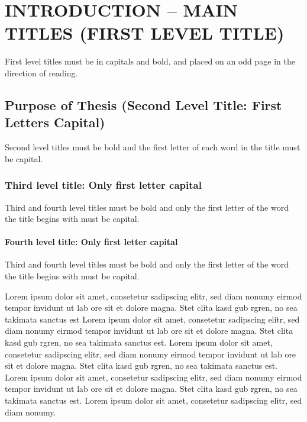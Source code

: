 \chapter{INTRODUCTION -- MAIN TITLES (FIRST LEVEL TITLE)}\label{Ch1}

First level titles must be in capitals and bold, and placed on an odd page in the direction of reading.

\section{Purpose of Thesis (Second Level Title: First Letters Capital)}\label{purposeofthesis}

Second level titles must be bold and the first letter of each word in the title must be capital.

\subsection{Third level title: Only first letter capital}

Third and fourth level titles must be bold and only the first letter of the word the title begins with must be capital.

\subsubsection{Fourth level title: Only first letter capital}

Third and fourth level titles must be bold and only the first letter of the word the title begins with must be capital.


Lorem ipsum dolor sit amet, consetetur sadipscing elitr, sed diam nonumy eirmod tempor invidunt ut lab ore sit et dolore magna. Stet clita kasd gub rgren, no sea takimata sanctus est Lorem ipsum dolor sit amet, consetetur sadipscing elitr, sed diam nonumy eirmod tempor invidunt ut lab ore sit et dolore magna. Stet clita kasd gub rgren, no sea takimata sanctus est. Lorem ipsum dolor sit amet, consetetur sadipscing elitr, sed diam nonumy eirmod tempor invidunt ut lab ore sit et dolore magna. Stet clita kasd gub rgren, no sea takimata sanctus est. Lorem ipsum dolor sit amet, consetetur sadipscing elitr, sed diam nonumy eirmod tempor invidunt ut lab ore sit et dolore magna. Stet clita kasd gub rgren, no sea takimata sanctus est. Lorem ipsum dolor sit amet, consetetur sadipscing elitr, sed diam nonumy.

